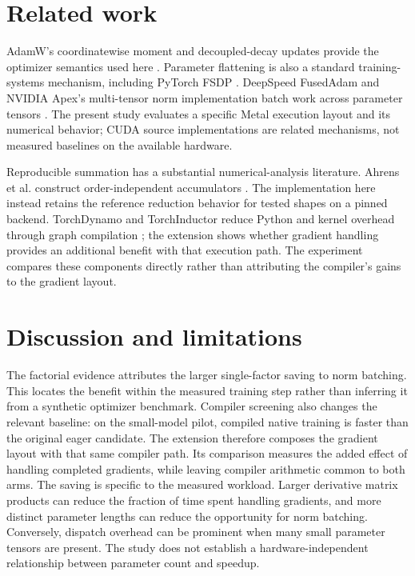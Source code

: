 \documentclass[11pt]{article}
\begin{document}
\section{Related work}
AdamW's coordinatewise moment and decoupled-decay updates provide the optimizer
semantics used here \cite{adamw}. Parameter flattening is also a standard
training-systems mechanism, including PyTorch FSDP \cite{fsdp}. DeepSpeed
FusedAdam and NVIDIA Apex's multi-tensor norm implementation batch work across
parameter tensors \cite{deepspeed,apex}. The present study evaluates a specific
Metal execution layout and its numerical behavior; CUDA source implementations
are related mechanisms, not measured baselines on the available hardware.

Reproducible summation has a substantial numerical-analysis literature.
Ahrens et al. construct order-independent accumulators \cite{repro}.
The implementation here instead retains the reference reduction behavior for
tested shapes on a pinned backend. TorchDynamo and TorchInductor reduce Python
and kernel overhead through graph compilation \cite{pytorch2}; the extension
shows whether gradient handling provides an additional benefit with that
execution path. The experiment compares these components directly rather than
attributing the compiler's gains to the gradient layout.

\section{Discussion and limitations}
The factorial evidence attributes the larger single-factor saving to norm batching. This locates the benefit within the measured training step rather than inferring it from a synthetic optimizer benchmark. Compiler screening also changes the relevant baseline: on the small-model pilot, compiled native training is faster than the original eager candidate. The extension therefore composes the gradient layout with that same compiler path. Its comparison measures the added effect of handling completed gradients, while leaving compiler arithmetic common to both arms.
The saving is specific to the measured workload. Larger derivative matrix
products can reduce the fraction of time spent handling gradients, and more
distinct parameter lengths can reduce the opportunity for norm batching.
Conversely, dispatch overhead can be prominent when many small parameter
tensors are present. The study does not establish a hardware-independent
relationship between parameter count and speedup.
\end{document}
